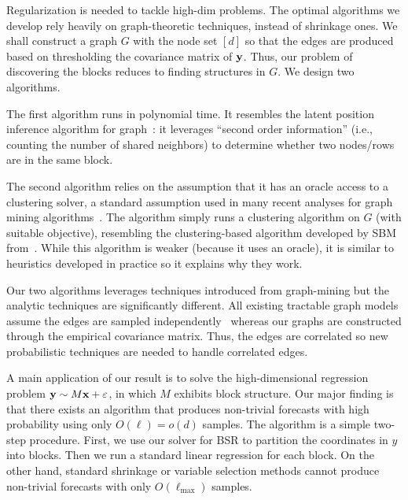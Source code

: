  Regularization is needed to tackle high-dim problems. The optimal algorithms we develop rely heavily on graph-theoretic techniques, instead of shrinkage ones. We shall construct a graph $G$ with the node set $[d]$ so that the edges are produced based on thresholding the covariance matrix of $\mathbf{y}$. Thus, our problem of discovering the blocks reduces to finding structures in $G$. We design two algorithms. 

The first algorithm runs in polynomial time. It resembles the latent position inference algorithm for graph~\cite{abraham2015low}: it leverages ``second order information'' (i.e., counting the number of shared neighbors) to determine whether two nodes/rows are in the same block. 

The second algorithm relies on the assumption that it has an oracle access to a clustering solver, a standard assumption used in many recent analyses for graph mining algorithms~\cite{rohe2011spectral,wolfe2013nonparametric,olhede2014network}. 
The algorithm simply runs a clustering algorithm on $G$ (with suitable objective), resembling the clustering-based algorithm developed by SBM from~\cite{rohe2011spectral}. While this algorithm is weaker (because it uses an oracle), it is similar to heuristics developed in practice so it explains why they work. 



Our two algorithms leverages techniques introduced from graph-mining but the analytic techniques are significantly different. All existing tractable graph models assume the edges are sampled independently~\cite{abbe2017community} whereas our graphs are constructed through the empirical covariance matrix. Thus, the edges are correlated so new probabilistic techniques are needed to handle correlated edges.  

A main application of our result is to solve the high-dimensional regression problem 
$\mathbf{y} \sim M \mathbf{x} + \varepsilon$, in which $M$ exhibits block structure. Our major finding is that there exists an algorithm that produces non-trivial forecasts with high probability using only $O(\ell) = o(d)$ samples. The algorithm is a simple two-step procedure. First, we use our solver for BSR to partition the coordinates in $y$ into blocks. Then we run a standard linear regression for each block. On the other hand, standard shrinkage or variable selection methods cannot produce non-trivial forecasts with only $O(\ell_{\max})$ samples.  

